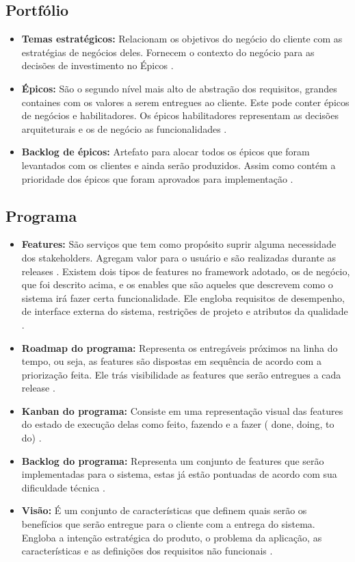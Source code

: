 \subsection{Portfólio}
\begin{itemize}
    \item \textbf{Temas estratégicos:} Relacionam os objetivos do negócio do cliente com as estratégias de negócios deles. Fornecem o contexto do negócio para as decisões de investimento no Épicos \cite{safe}.
    \item \textbf{Épicos:} São o segundo nível mais alto de abstração dos requisitos, grandes containes com os valores a serem entregues ao cliente. Este pode conter épicos de negócios e habilitadores. Os épicos habilitadores representam as decisões arquiteturais e os de negócio as funcionalidades \cite{safe}.
    \item \textbf{Backlog de épicos:} Artefato para alocar todos os épicos que foram levantados com os clientes e ainda serão produzidos. Assim como contém a prioridade dos épicos que foram aprovados para implementação \cite{safe}.
\end{itemize}

\subsection{Programa}
\begin{itemize}
    \item \textbf{ Features:} São serviços que tem como propósito suprir alguma necessidade dos stakeholders. Agregam valor para o usuário e são realizadas durante as releases \cite{leffingwell2011}. Existem dois tipos de features no framework adotado, os de negócio, que foi descrito acima, e os enables que são aqueles que descrevem como o sistema irá fazer certa funcionalidade. Ele engloba requisitos de desempenho, de interface externa do sistema, restrições de projeto e atributos da qualidade \cite{safe}.
    \item \textbf{ Roadmap do programa:} Representa os entregáveis próximos na linha do tempo, ou seja, as features são dispostas em sequência de acordo com a priorização feita. Ele trás visibilidade as features que serão entregues a cada release \cite{safe}.
    \item \textbf{ Kanban do programa:} Consiste em uma representação visual das features do estado de execução delas como feito, fazendo e a fazer ( done, doing, to do) \cite{leffingwell2011}.
    \item \textbf{ Backlog do programa:} Representa um conjunto de features que serão implementadas para o sistema, estas já estão pontuadas de acordo com sua dificuldade técnica \cite{safe}.
    \item \textbf{ Visão:} É um conjunto de características que definem quais serão os benefícios que serão entregue para o cliente com a entrega do sistema. Engloba a intenção estratégica do produto, o problema da aplicação, as características e as definições dos requisitos não funcionais \cite{leffingwell2011}. 
\end{itemize}
